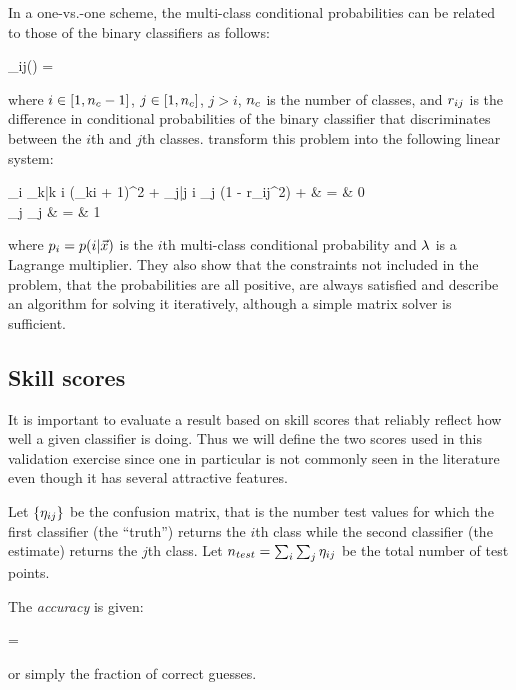 In a one-vs.-one scheme, the multi-class conditional probabilities 
can be related to those of the binary classifiers as follows:
\begin{eqnnon}
	\diffcondprob_{ij}(\point) = 
	\label{bin2multi}
\end{eqnnon}
where $i\in[1,n_c-1]$, $j\in[1,n_c]$, 
$j>i$,
$n_c$ is the number of classes, 
and $r_{ij}$ is the difference in conditional probabilities of
the binary classifier that discriminates between the $i$th and $j$th classes.
\citet{Wu_etal2004} transform this problem into the following linear system:
\begin{eqnarraynon}
	\multiprob_i \sum_{k|k \ne i} (\diffcondprob_{ki} + 1)^2 +
	\sum_{j|j \ne i} \multiprob_j (1 - r_{ij}^2) + \lmult & = & 0 \\ \nonumber
	\sum_j \multiprob_j & = & 1
	\label{multiclass}
\end{eqnarraynon}
where $p_i = p(i | \vec {x})$ is the $i$th multi-class 
conditional probability and $\lambda$ is a Lagrange multiplier.
They also show that the constraints not included in the problem, that
the probabilities are all positive, are always satisfied
and describe an algorithm for solving it iteratively, although a
simple matrix solver is sufficient.

\subsection{Skill scores}

\label{skill_scores}

It is important to evaluate a result based on skill scores that reliably reflect
how well a given classifier is doing.
Thus we will define the two scores used in this validation exercise 
since one in particular is not commonly seen in the literature even though it has several
attractive features.

Let $\lbrace \eta_{ij} \rbrace$ be the confusion matrix, that is the number
test values for which the first classifier (the ``truth'') returns the $i$th class
while the second classifier (the estimate) returns the $j$th class.
Let $n_{test}=\sum_i \sum_j \eta_{ij}$ be the total number of test points.

The {\it accuracy} is given:
\begin{eqnnon}
\accuracy=
\label{accuracy}
\end{eqnnon}
or simply the fraction of correct guesses.

